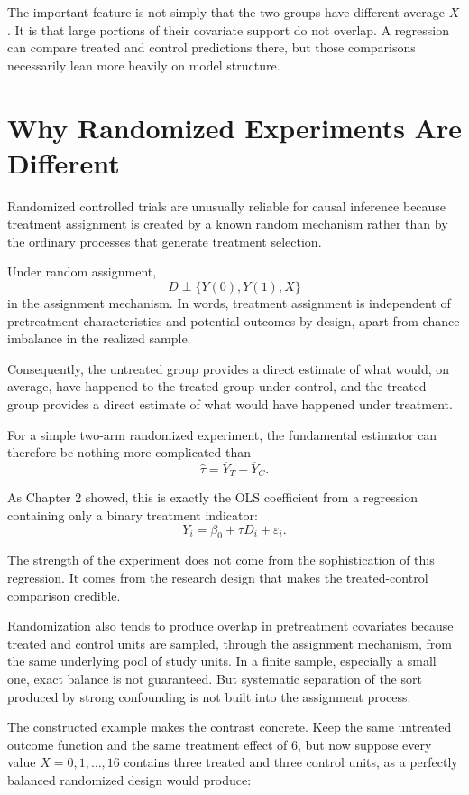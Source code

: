 \documentclass[11pt]{report}
\begin{document}
The important feature is not simply that the two groups have different average \(X\). It is that large portions of their covariate support do not overlap. A regression can compare treated and control predictions there, but those comparisons necessarily lean more heavily on model structure.

\section{Why Randomized Experiments Are Different}

Randomized controlled trials are unusually reliable for causal inference because treatment assignment is created by a known random mechanism rather than by the ordinary processes that generate treatment selection.

Under random assignment,
\[
D \perp \{Y(0),Y(1),X\}
\]
in the assignment mechanism. In words, treatment assignment is independent of pretreatment characteristics and potential outcomes by design, apart from chance imbalance in the realized sample.

Consequently, the untreated group provides a direct estimate of what would, on average, have happened to the treated group under control, and the treated group provides a direct estimate of what would have happened under treatment.

For a simple two-arm randomized experiment, the fundamental estimator can therefore be nothing more complicated than
\[
\widehat{\tau}
=
\overline{Y}_{T}-\overline{Y}_{C}.
\]

As Chapter 2 showed, this is exactly the OLS coefficient from a regression containing only a binary treatment indicator:
\[
Y_i=\beta_0+\tau D_i+\varepsilon_i.
\]

The strength of the experiment does not come from the sophistication of this regression. It comes from the research design that makes the treated-control comparison credible.

Randomization also tends to produce overlap in pretreatment covariates because treated and control units are sampled, through the assignment mechanism, from the same underlying pool of study units. In a finite sample, especially a small one, exact balance is not guaranteed. But systematic separation of the sort produced by strong confounding is not built into the assignment process.

The constructed example makes the contrast concrete. Keep the same untreated outcome function and the same treatment effect of 6, but now suppose every value \(X=0,1,\ldots,16\) contains three treated and three control units, as a perfectly balanced randomized design would produce:
\end{document}
